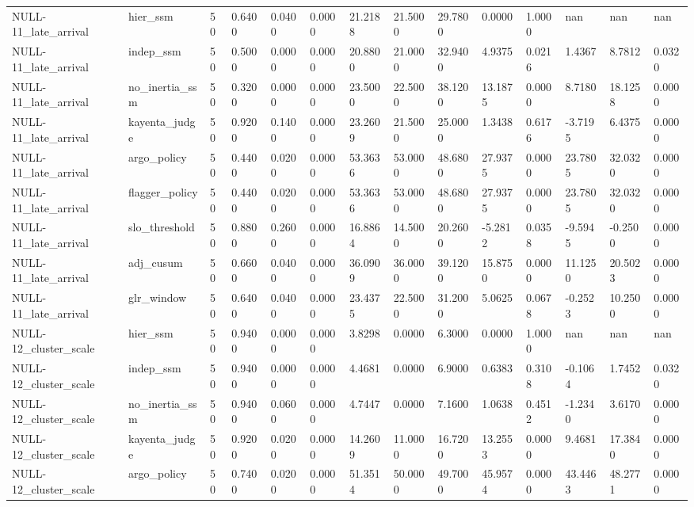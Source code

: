 \begin{table}[htbp]
\begin{tabular}{llllllllllllll}
NULL-11\_late\_arrival & hier\_ssm & 50 & 0.6400 & 0.0400 & 0.0000 & 21.2188 & 21.5000 & 29.7800 & 0.0000 & 1.0000 & nan & nan & nan \\
NULL-11\_late\_arrival & indep\_ssm & 50 & 0.5000 & 0.0000 & 0.0000 & 20.8800 & 21.0000 & 32.9400 & 4.9375 & 0.0216 & 1.4367 & 8.7812 & 0.0320 \\
NULL-11\_late\_arrival & no\_inertia\_ssm & 50 & 0.3200 & 0.0000 & 0.0000 & 23.5000 & 22.5000 & 38.1200 & 13.1875 & 0.0000 & 8.7180 & 18.1258 & 0.0000 \\
NULL-11\_late\_arrival & kayenta\_judge & 50 & 0.9200 & 0.1400 & 0.0000 & 23.2609 & 21.5000 & 25.0000 & 1.3438 & 0.6176 & -3.7195 & 6.4375 & 0.0000 \\
NULL-11\_late\_arrival & argo\_policy & 50 & 0.4400 & 0.0200 & 0.0000 & 53.3636 & 53.0000 & 48.6800 & 27.9375 & 0.0000 & 23.7805 & 32.0320 & 0.0000 \\
NULL-11\_late\_arrival & flagger\_policy & 50 & 0.4400 & 0.0200 & 0.0000 & 53.3636 & 53.0000 & 48.6800 & 27.9375 & 0.0000 & 23.7805 & 32.0320 & 0.0000 \\
NULL-11\_late\_arrival & slo\_threshold & 50 & 0.8800 & 0.2600 & 0.0000 & 16.8864 & 14.5000 & 20.2600 & -5.2812 & 0.0358 & -9.5945 & -0.2500 & 0.0000 \\
NULL-11\_late\_arrival & adj\_cusum & 50 & 0.6600 & 0.0400 & 0.0000 & 36.0909 & 36.0000 & 39.1200 & 15.8750 & 0.0000 & 11.1250 & 20.5023 & 0.0000 \\
NULL-11\_late\_arrival & glr\_window & 50 & 0.6400 & 0.0400 & 0.0000 & 23.4375 & 22.5000 & 31.2000 & 5.0625 & 0.0678 & -0.2523 & 10.2500 & 0.0000 \\
NULL-12\_cluster\_scale & hier\_ssm & 50 & 0.9400 & 0.0000 & 0.0000 & 3.8298 & 0.0000 & 6.3000 & 0.0000 & 1.0000 & nan & nan & nan \\
NULL-12\_cluster\_scale & indep\_ssm & 50 & 0.9400 & 0.0000 & 0.0000 & 4.4681 & 0.0000 & 6.9000 & 0.6383 & 0.3108 & -0.1064 & 1.7452 & 0.0320 \\
NULL-12\_cluster\_scale & no\_inertia\_ssm & 50 & 0.9400 & 0.0600 & 0.0000 & 4.7447 & 0.0000 & 7.1600 & 1.0638 & 0.4512 & -1.2340 & 3.6170 & 0.0000 \\
NULL-12\_cluster\_scale & kayenta\_judge & 50 & 0.9200 & 0.0200 & 0.0000 & 14.2609 & 11.0000 & 16.7200 & 13.2553 & 0.0000 & 9.4681 & 17.3840 & 0.0000 \\
NULL-12\_cluster\_scale & argo\_policy & 50 & 0.7400 & 0.0200 & 0.0000 & 51.3514 & 50.0000 & 49.7000 & 45.9574 & 0.0000 & 43.4463 & 48.2771 & 0.0000 \\

\end{tabular}
\end{table}
